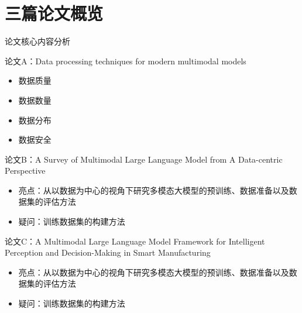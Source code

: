 \documentclass[aspectratio=169,AutoFakeBold]{beamer}
\begin{document}
\section{三篇论文概览}
\begin{frame}{论文核心内容分析}
    \begin{block}{论文A：Data processing techniques for modern multimodal models}
        \begin{itemize}
            \item 数据质量
            \item 数据数量
            \item 数据分布
            \item 数据安全
        \end{itemize}
    \end{block}

    \begin{block}{论文B：A Survey of Multimodal Large Language Model from A Data-centric Perspective}
        \begin{itemize}
            \item 亮点：从以数据为中心的视角下研究多模态大模型的预训练、数据准备以及数据集的评估方法
            \item 疑问：训练数据集的构建方法
        \end{itemize}
    \end{block}
    \begin{block}{论文C：A Multimodal Large Language Model Framework for Intelligent Perception and Decision-Making in Smart Manufacturing}
        \begin{itemize}
            \item 亮点：从以数据为中心的视角下研究多模态大模型的预训练、数据准备以及数据集的评估方法
            \item 疑问：训练数据集的构建方法
        \end{itemize}
    \end{block}
\end{frame}
\end{document}
